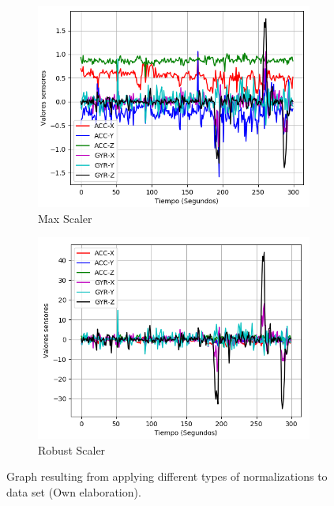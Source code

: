 \begin{figure}
{\begin{varwidth}{\textwidth}
        \begin{subfigure}[h]{0.45\textwidth} 
            \includegraphics[width=\textwidth]{imagenes/Cap3/datos_max_scaler}
            \caption{Max Scaler}
            \label{fig:max}
        \end{subfigure}       
        \begin{subfigure}[h]{0.45\textwidth} 
            \includegraphics[width=\textwidth]{imagenes/Cap3/datos_robust_scaler}
            \caption{Robust Scaler}
            \label{fig:robust}
        \end{subfigure}
        \end{varwidth}}
        \caption{Graph resulting from applying different types of normalizations to data set (Own elaboration).}
		\label{fig:nor_nor}
    \end{figure}

